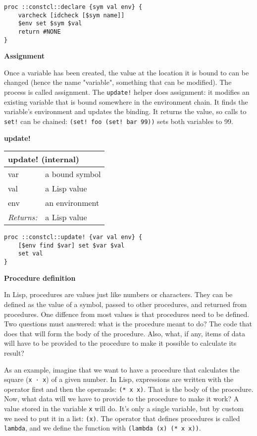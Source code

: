 \documentclass{report}
\begin{document}
\noindent\makebox[\linewidth]{\rule{\linewidth}{0.4pt}}
\begin{lstlisting}
proc ::constcl::declare {sym val env} {
    varcheck [idcheck [$sym name]]
    $env set $sym $val
    return #NONE
}
\end{lstlisting}
\noindent\makebox[\linewidth]{\rule{\linewidth}{0.4pt}}

\textbf{Assignment}


Once a variable has been created, the value at the location it is bound to can be changed (hence the name "variable", something that can be modified). The process is called assignment. The \texttt{update!} helper does assignment: it modifies an existing variable that is bound somewhere in the environment chain. It finds the variable's environment and updates the binding. It returns the value, so calls to \texttt{set!} can be chained: \texttt{(set! foo (set! bar 99))} sets both variables to 99.


\textbf{update!}

\begin{tabular}{ |l l| }
\hline
\multicolumn{2}{|l|}{update! (internal)} \\
\hline
var & a bound symbol \\
val & a Lisp value \\
env & an environment \\
\textit{Returns:} & a Lisp value \\
\hline
\end{tabular}

\noindent\makebox[\linewidth]{\rule{\linewidth}{0.4pt}}
\begin{lstlisting}
proc ::constcl::update! {var val env} {
    [$env find $var] set $var $val
    set val
}
\end{lstlisting}
\noindent\makebox[\linewidth]{\rule{\linewidth}{0.4pt}}

\textbf{Procedure definition}


In Lisp, procedures are values just like numbers or characters. They can be defined as the value of a symbol, passed to other procedures, and returned from procedures. One diffence from most values is that procedures need to be defined. Two questions must answered: what is the procedure meant to do? The code that does that will form the body of the procedure. Also, what, if any, items of data will have to be provided to the procedure to make it possible to calculate its result?


As an example, imagine that we want to have a procedure that calculates the square (\texttt{x · x}) of a given number. In Lisp, expressions are written with the operator first and then the operands: \texttt{(* x x)}. That is the body of the procedure. Now, what data will we have to provide to the procedure to make it work? A value stored in the variable \texttt{x} will do. It's only a single variable, but by custom we need to put it in a list: \texttt{(x)}. The operator that defines procedures is called \texttt{lambda}, and we define the function with \texttt{(lambda (x) (* x x))}.
\end{document}
